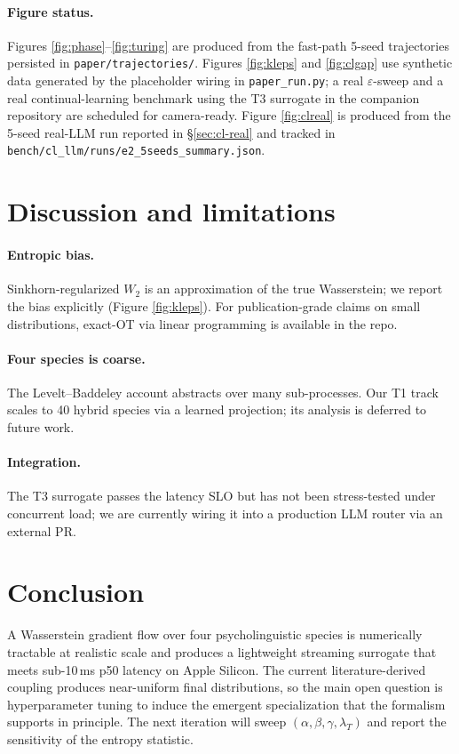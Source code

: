 \documentclass[11pt]{article}
\begin{document}
\paragraph{Figure status.}
Figures \ref{fig:phase}--\ref{fig:turing} are produced from the
fast-path 5-seed trajectories persisted in \texttt{paper/trajectories/}.
Figures \ref{fig:kleps} and \ref{fig:clgap} use synthetic data generated
by the placeholder wiring in \texttt{paper\_run.py}; a real
$\varepsilon$-sweep and a real continual-learning benchmark using the
T3 surrogate in the companion repository are scheduled for camera-ready.
Figure \ref{fig:clreal} is produced from the 5-seed real-LLM run
reported in §\ref{sec:cl-real} and tracked in
\texttt{bench/cl\_llm/runs/e2\_5seeds\_summary.json}.

\section{Discussion and limitations}
\label{sec:disc}

\paragraph{Entropic bias.} Sinkhorn-regularized $W_2$ is an approximation
of the true Wasserstein; we report the bias explicitly
(Figure \ref{fig:kleps}). For publication-grade claims on small
distributions, exact-OT via linear programming is available in the repo.

\paragraph{Four species is coarse.} The Levelt--Baddeley account abstracts
over many sub-processes. Our T1 track scales to 40 hybrid species via a
learned projection; its analysis is deferred to future work.

\paragraph{Integration.} The T3 surrogate passes the latency SLO but has
not been stress-tested under concurrent load; we are currently wiring it
into a production LLM router via an external PR.

\section{Conclusion}
\label{sec:conclusion}

A Wasserstein gradient flow over four psycholinguistic species is
numerically tractable at realistic scale and produces a lightweight
streaming surrogate that meets sub-10\,ms p50 latency on Apple Silicon.
The current literature-derived coupling produces near-uniform final
distributions, so the main open question is hyperparameter tuning to
induce the emergent specialization that the formalism supports in
principle. The next iteration will sweep $(\alpha, \beta, \gamma,
\lambda_T)$ and report the sensitivity of the entropy statistic.
\end{document}
